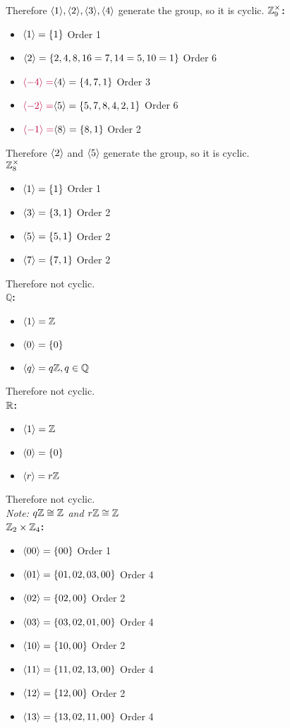 \documentclass[openany]{report}
\begin{document}
Therefore $\langle 1 \rangle,\langle 2 \rangle, \langle 3 \rangle, \langle 4 \rangle$ generate the group, so it is cyclic.
\textbf{$\mathbb{Z}_9^\times$:}
\begin{itemize}
    \item $\langle 1 \rangle = \{1\}$ Order 1
    \item $\langle 2 \rangle = \{2,4,8,16=7,14=5,10=1\}$ Order 6
    \item $\textcolor{purple}{\langle -4 \rangle =}\langle 4 \rangle = \{4,7,1\}$ Order 3
    \item $\textcolor{purple}{\langle -2 \rangle =}\langle 5 \rangle = \{5,7,8,4,2,1\}$ Order 6
    \item $\textcolor{purple}{\langle -1 \rangle =}\langle 8 \rangle = \{8,1\}$ Order 2
\end{itemize}
Therefore $\langle 2 \rangle$ and $\langle 5 \rangle$ generate the group, so it is cyclic.\\[2ex]
\textbf{$\mathbb{Z}_8^\times$}
\begin{itemize}
    \item $\langle 1 \rangle = \{1\}$ Order 1
    \item $\langle 3 \rangle = \{3,1\}$ Order 2
    \item $\langle 5 \rangle = \{5,1\}$ Order 2
    \item $\langle 7 \rangle = \{7,1\}$ Order 2
\end{itemize}
Therefore not cyclic.\\[2ex]
\textbf{$\mathbb{Q}$:}
\begin{itemize}
    \item $\langle 1 \rangle = \mathbb{Z}$
    \item $\langle 0 \rangle = \{0\}$
    \item $\langle q \rangle = q\mathbb{Z}, q \in \mathbb{Q}$
\end{itemize}
Therefore not cyclic.\\[2ex]
\textbf{$\mathbb{R}$:}
\begin{itemize}
    \item $\langle 1 \rangle = \mathbb{Z}$
    \item $\langle 0 \rangle = \{0\}$
    \item $\langle r \rangle = r\mathbb{Z}$
\end{itemize}
Therefore not cyclic. \\[2ex]
\textit{Note: $q\mathbb{Z} \cong \mathbb{Z}$ and $r \mathbb{Z} \cong \mathbb{Z}$}\\[2ex]
\textbf{$\mathbb{Z}_2 \times \mathbb{Z}_4$:}
\begin{itemize}
    \item $\langle 00 \rangle = \{00\}$ Order 1
    \item $\langle 01 \rangle = \{01, 02,03,00\}$ Order 4
    \item $\langle 02 \rangle = \{02,00\}$ Order 2
    \item $\langle 03 \rangle = \{03,02,01,00\}$ Order 4
    \item $\langle 10 \rangle = \{10,00\}$ Order 2
    \item $\langle 11 \rangle = \{11, 02, 13,00\}$ Order 4 
    \item $\langle 12 \rangle = \{12, 00\}$ Order 2 
    \item $\langle 13 \rangle = \{13, 02, 11,00\}$ Order 4
\end{itemize}
\end{document}
